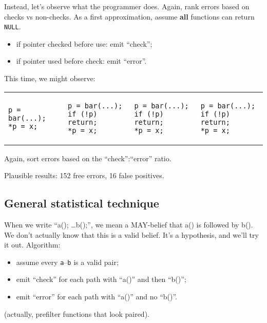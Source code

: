 \documentclass[11pt]{article}
\begin{document}
Instead, let's observe what the programmer does.
Again, rank errors based on checks vs non-checks.
As a first approximation, assume {\bf all} functions can return {\tt NULL}.
\begin{itemize}[noitemsep]
  \item if pointer checked before use: emit ``check'';
  \item if pointer used before check: emit ``error''.
\end{itemize}

This time, we might observe:

\begin{center}
\begin{tabular}{l|l|l|l}
\begin{minipage}{7em}
\begin{lstlisting}[numbers=none]
p = bar(...);
*p = x;
\end{lstlisting}
\end{minipage} &
\begin{minipage}{8.5em}
\begin{lstlisting}[numbers=none]
p = bar(...);
if (!p) return;
*p = x;
\end{lstlisting}

\end{minipage} &\begin{minipage}{8.5em}
\begin{lstlisting}[numbers=none]
p = bar(...);
if (!p) return;
*p = x;
\end{lstlisting}

\end{minipage} &\begin{minipage}{8.5em}
\begin{lstlisting}[numbers=none]
p = bar(...);
if (!p) return;
*p = x;
\end{lstlisting}

\end{minipage}
\end{tabular}
\end{center}

Again, sort errors based on the ``check'':``error'' ratio.

Plausible results: 152 free errors, 16 false positives.

\newpage
\subsection*{General statistical technique}
When we write ``a(); \ldots b();'', we mean a MAY-belief that a() is followed by b().
We don't actually know that this is a valid belief. It's a hypothesis, and we'll try it out.
Algorithm: 
\vspace*{-1em}
\begin{itemize}[noitemsep]
\item assume every {\tt a}--{\tt b} is a valid pair;
\item emit ``check'' for each path with ``a()'' and then ``b()'';
\item emit ``error'' for each path with ``a()'' and no ``b()''.
\end{itemize}
(actually, prefilter functions that look paired).
\end{document}

